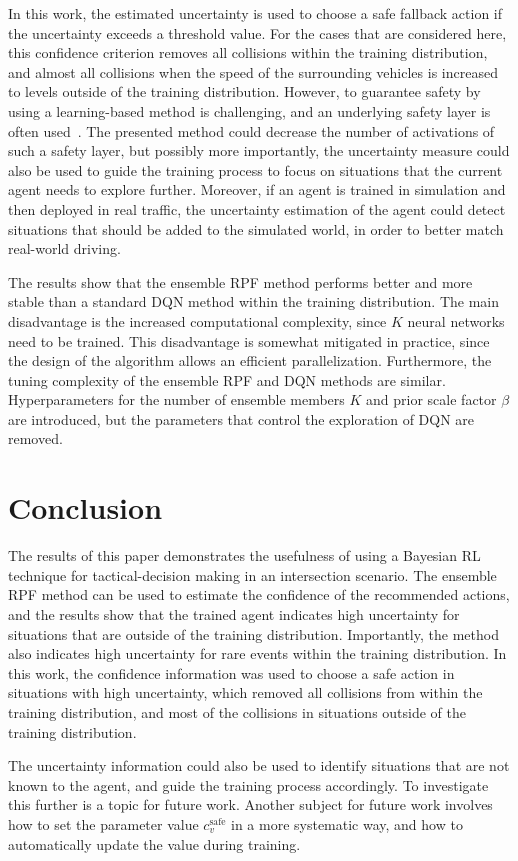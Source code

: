 In this work, the estimated uncertainty is used to choose a safe fallback action if the uncertainty exceeds a threshold value. For the cases that are considered here, this confidence criterion removes all collisions within the training distribution, and almost all collisions when the speed of the surrounding vehicles is increased to levels outside of the training distribution. However, to guarantee safety by using a learning-based method is challenging, and an underlying safety layer is often used~\cite{Underwood2016}. The presented method could decrease the number of activations of such a safety layer, but possibly more importantly, the uncertainty measure could also be used to guide the training process to focus on situations that the current agent needs to explore further. Moreover, if an agent is trained in simulation and then deployed in real traffic, the uncertainty estimation of the agent could detect situations that should be added to the simulated world, in order to better match real-world driving.

The results show that the ensemble RPF method performs better and more stable than a standard DQN method within the training distribution. The main disadvantage is the increased computational complexity, since $K$ neural networks need to be trained. This disadvantage is somewhat mitigated in practice, since the design of the algorithm allows an efficient parallelization. Furthermore, the tuning complexity of the ensemble RPF and DQN methods are similar. Hyperparameters for the number of ensemble members $K$ and prior scale factor $\beta$ are introduced, but the parameters that control the exploration of DQN are removed.


\section{Conclusion}
\label{sec:conclusion}

The results of this paper demonstrates the usefulness of using a Bayesian RL technique for tactical-decision making in an intersection scenario. The ensemble RPF method can be used to estimate the confidence of the recommended actions, and the results show that the trained agent indicates high uncertainty for situations that are outside of the training distribution. Importantly, the method also indicates high uncertainty for rare events within the training distribution. In this work, the confidence information was used to choose a safe action in situations with high uncertainty, which removed all collisions from within the training distribution, and most of the collisions in situations outside of the training distribution. 

The uncertainty information could also be used to identify situations that are not known to the agent, and guide the training process accordingly. To investigate this further is a topic for future work. Another subject for future work involves how to set the parameter value $c_v^\mathrm{safe}$ in a more systematic way, and how to automatically update the value during training.
